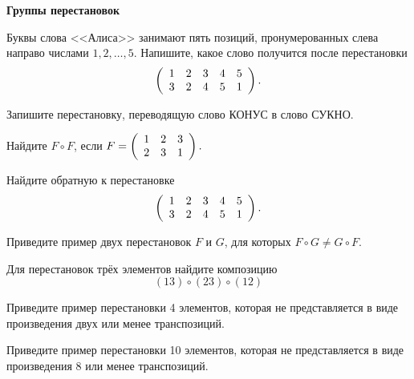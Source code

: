 \documentclass{article}
\begin{document}
    \large


    \begin{center}
        \textbf{Группы перестановок}
    \end{center}

    \begin{enumerate_boxed}

        \item Буквы слова <<Алиса>> занимают пять позиций, пронумерованных
        слева направо числами $1, 2, \dotsc , 5.$
        Напишите, какое слово получится после
        перестановки
        \[\left(
        \begin{array}{c c c c c}
            1 & 2 & 3 & 4 & 5 \\
            3 & 2 & 4 & 5 & 1
        \end{array}
        \right).\]

        \item Запишите перестановку, переводящую слово КОНУС в слово СУКНО.

        \item Найдите $F \circ F$, если $F = \left(
        \begin{array}{c c c}
            1 & 2 & 3 \\
            2 & 3 & 1
        \end{array}
        \right).$

        \item Найдите обратную к перестановке
        \[\left(
        \begin{array}{c c c c c}
            1 & 2 & 3 & 4 & 5 \\
            3 & 2 & 4 & 5 & 1
        \end{array}
        \right).\]

        \item Приведите пример двух перестановок $F$ и $G$, для которых $F \circ G \neq G \circ F$.

        \item Для перестановок трёх элементов найдите композицию \[(13) \circ (23) \circ (12)\]

        \item Приведите пример перестановки 4 элементов, которая не представляется в виде произведения двух или менее транспозиций.

        \item Приведите пример перестановки 10 элементов, которая не представляется в виде произведения 8 или менее транспозиций.


\end{enumerate_boxed}
\end{document}
